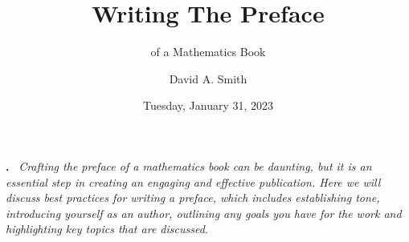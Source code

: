 \documentclass[
  twoside,
  12pt,
  letterpaper,
  fleqn]{article}
\title{Writing The Preface}
\subtitle{of a Mathematics Book}
\author{David A. Smith}
\date{Tuesday, January 31, 2023}
\renewenvironment{abstract}
{\par\noindent\textbf{\abstractname.}\ \ignorespaces \itshape}
{\par\medskip}
\begin{document}
\maketitle
\begin{abstract}
Crafting the preface of a mathematics book can be daunting, but it is an
essential step in creating an engaging and effective publication. Here
we will discuss best practices for writing a preface, which includes
establishing tone, introducing yourself as an author, outlining any
goals you have for the work and highlighting key topics that are
discussed.
\end{abstract}
\ifdefined\Shaded\renewenvironment{Shaded}{\begin{tcolorbox}[frame hidden, sharp corners, breakable, borderline west={3pt}{0pt}{shadecolor}, enhanced, boxrule=0pt, interior hidden]}{\end{tcolorbox}}\fi




\printbibliography



\thispagestyle{empty}
\end{document}
